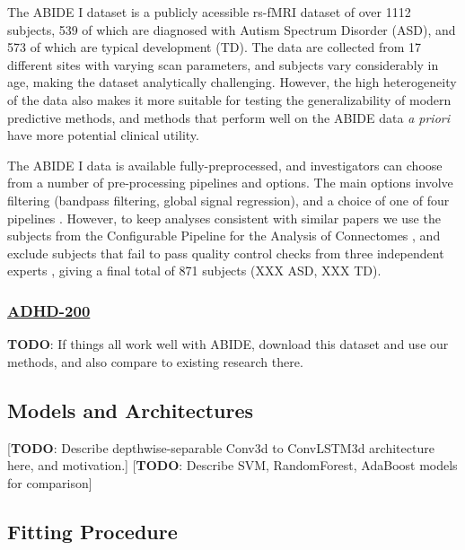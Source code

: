 \documentclass[10pt]{article}
\begin{document}
The ABIDE I dataset \citep{dimartinoAutismBrainImaging2014} is a publicly acessible rs-fMRI dataset of over
1112 subjects, 539 of which are diagnosed with Autism Spectrum Disorder (ASD),
and 573 of which are typical development (TD). The data are collected from 17 different sites with
varying scan parameters, and subjects vary considerably in age, making the dataset analytically
challenging. However, the high heterogeneity of the data also makes it more suitable for testing the
generalizability of modern predictive methods, and methods that perform well on the ABIDE data
\emph{a priori} have more potential clinical utility.

The ABIDE I data is available fully-preprocessed, and investigators can choose from a number of
pre-processing pipelines and options. The main options involve filtering (bandpass filtering, global
signal regression), and a choice of one of four pipelines \citep{dimartinoAutismBrainImaging2014}.
However, to keep analyses consistent with similar papers
\citet{abrahamDerivingReproducibleBiomarkers2017, mostafaDiagnosisAutismSpectrum2019,
yinDiagnosisAutismSpectrum2021, heinsfeldIdentificationAutismSpectrum2018} we use the subjects from
the Configurable Pipeline for the Analysis of Connectomes
\citep[CPAC;][]{cameronAutomatedAnalysisConnectomes2013}, and exclude subjects that fail to pass quality
control checks from three independent experts \citep[see][for
details]{abrahamDerivingReproducibleBiomarkers2017}, giving a final total of 871 subjects (XXX ASD,
XXX TD).

\subsubsection{\href{http://preprocessed-connectomes-project.org/adhd200/}{ADHD-200}}

\textbf{TODO}: If things all work well with ABIDE, download this dataset and use our methods, and also
compare to existing research there.

\subsection{Models and Architectures}

[\textbf{TODO}: Describe depthwise-separable Conv3d to ConvLSTM3d architecture here, and motivation.]
[\textbf{TODO}: Describe SVM, RandomForest, AdaBoost models for comparison]

\subsection{Fitting Procedure}
\end{document}
